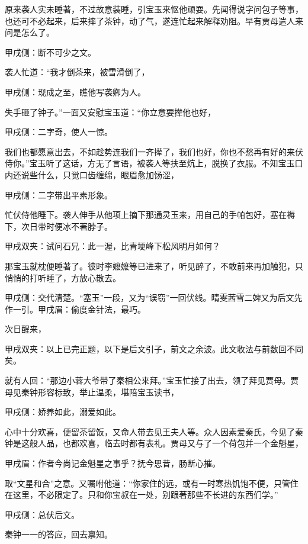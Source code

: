 \begin{parag}
    原来袭人实未睡著，不过故意装睡，引宝玉来怄他顽耍。先闻得说字问包子等事，也还可不必起来，后来摔了茶钟，动了气，遂连忙起来解释劝阻。早有贾母遣人来问是怎么了。\begin{note}甲戌侧：断不可少之文。\end{note}袭人忙道：“我才倒茶来，被雪滑倒了，\begin{note}甲戌侧：现成之至，瞧他写袭卿为人。\end{note}失手砸了钟子。”一面又安慰宝玉道：“你立意要撵他也好，\begin{note}甲戌侧：二字奇，使人一惊。\end{note}我们也都愿意出去，不如趁势连我们一齐撵了，我们也好，你也不愁再有好的来伏侍你。”宝玉听了这话，方无了言语，被袭人等扶至炕上，脱换了衣服。不知宝玉口内还说些什么，只觉口齿缠绵，眼眉愈加饧涩，\begin{note}甲戌侧：二字带出平素形象。\end{note}忙伏侍他睡下。袭人伸手从他项上摘下那通灵玉来，用自己的手帕包好，塞在褥下，次日带时便冰不著脖子。\begin{note}甲戌双夹：试问石兄：此一渥，比青埂峰下松风明月如何？\end{note}那宝玉就枕便睡著了。彼时李嬷嬷等已进来了，听见醉了，不敢前来再加触犯，只悄悄的打听睡了，方放心散去。\begin{note}甲戌侧：交代清楚。“塞玉”一段，又为“误窃”一回伏线。晴雯茜雪二婢又为后文先作一引。甲戌眉：偷度金针法，最巧。\end{note}
\end{parag}


\begin{parag}
    次日醒来，\begin{note}甲戌双夹：以上已完正题，以下是后文引子，前文之余波。此文收法与前数回不同矣。\end{note}就有人回：“那边小蓉大爷带了秦相公来拜。”宝玉忙接了出去，领了拜见贾母。贾母见秦钟形容标致，举止温柔，堪陪宝玉读书，\begin{note}甲戌侧：娇养如此，溺爱如此。\end{note}心中十分欢喜，便留茶留饭，又命人带去见王夫人等。众人因素爱秦氏，今见了秦钟是这般人品，也都欢喜，临去时都有表礼。贾母又与了一个荷包并一个金魁星，\begin{note}甲戌眉：作者今尚记金魁星之事乎？抚今思昔，肠断心摧。\end{note}取“文星和合”之意。又嘱咐他道：“你家住的远，或有一时寒热饥饱不便，只管住在这里，不必限定了。只和你宝叔在一处，别跟著那些不长进的东西们学。”\begin{note}甲戌侧：总伏后文。\end{note}秦钟一一的答应，回去禀知。
\end{parag}


